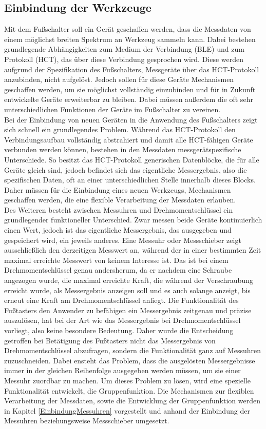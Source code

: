 \subsection{Einbindung der Werkzeuge}
Mit dem Fußschalter soll ein Gerät geschaffen werden, dass die Messdaten von einem möglichst breiten Spektrum an Werkzeug sammeln kann. Dabei bestehen grundlegende Abhängigkeiten zum Medium der Verbindung (\ac{BLE}) und zum Protokoll (\ac{HCT}), das über diese Verbindung gesprochen wird. Diese werden aufgrund der Spezifikation des Fußschalters, Messgeräte über das \ac{HCT}-Protokoll anzubinden, nicht aufgelöst. Jedoch sollen für diese Geräte Mechanismen geschaffen werden, um sie möglichst vollständig einzubinden und für in Zukunft entwickelte Geräte erweiterbar zu bleiben. Dabei müssen außerdem die oft sehr unterschiedlichen Funktionen der Geräte im Fußschalter zu vereinen.\\
Bei der Einbindung von neuen Geräten in die Anwendung des Fußschalters zeigt sich schnell ein grundlegendes Problem. Während das \ac{HCT}-Protokoll den Verbindungsaufbau vollständig abstrahiert und damit alle \ac{HCT}-fähigen Geräte verbunden werden können, bestehen in den Messdaten messgerätspezifische Unterschiede. So besitzt das \ac{HCT}-Protokoll generischen Datenblöcke, die für alle Geräte gleich sind, jedoch befindet sich das eigentliche Messergebnis, also die spezifischen Daten, oft an einer unterschiedlichen Stelle innerhalb dieses Blocks. Daher müssen für die Einbindung eines neuen Werkzeugs, Mechanismen geschaffen werden, die eine flexible Verarbeitung der Messdaten erlauben.\\
Des Weiteren besteht zwischen Messuhren und Drehmomentschlüssel ein grundlegender funktioneller Unterschied. Zwar messen beide Geräte kontinuierlich einen Wert, jedoch ist das eigentliche Messergebnis, das ausgegeben und gespeichert wird, ein jeweils anderes. Eine Messuhr oder Messschieber zeigt ausschließlich den derzeitigen Messwert an, während der in einer bestimmten Zeit maximal erreichte Messwert von keinem Interesse ist. Das ist bei einem Drehmomentschlüssel genau andersherum, da er nachdem eine Schraube angezogen wurde, die maximal erreichte Kraft, die während der Verschraubung erreicht wurde, als Messergebnis anzeigen soll und es auch solange anzeigt, bis erneut eine Kraft am Drehmomentschlüssel anliegt. 
Die Funktionalität des Fußtasters den Anwender zu befähigen ein Messergebnis zeitgenau und präzise auszulösen, hat bei der Art wie das Messergebnis bei Drehmomentschlüssel vorliegt, also keine besondere Bedeutung. Daher wurde die Entscheidung getroffen bei Betätigung des Fußtasters nicht das Messergebnis von Drehmomentschlüssel abzufragen, sondern die Funktionalität ganz auf Messuhren zuzuschneiden. Dabei ensteht das Problem, dass die ausgelösten Messergebnisse immer in der gleichen Reihenfolge ausgegeben werden müssen, um sie einer Messuhr zuordbar zu machen. Um dieses Problem zu lösen, wird eine spezielle Funktionalität entwickelt, die Gruppenfunktion. Die Mechanismen zur flexiblen Verarbeitung der Messdaten, sowie die Entwicklung der Gruppenfunktion werden in Kapitel \ref{EinbindungMessuhren} vorgestellt und anhand der Einbindung der Messuhren beziehungsweise Messschieber umgesetzt.

